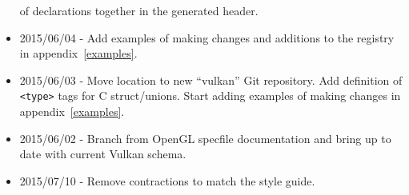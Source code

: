 \documentclass{article}
\def\tag#1{{\tt <#1>\index{<#1>}}}
\begin{document}
\begin{itemize}
      of declarations together in the generated header.
\item 2015/06/04 - Add examples of making changes and additions to the
      registry in appendix~\ref{examples}.
\item 2015/06/03 - Move location to new ``vulkan'' Git repository. Add
      definition of \tag{type} tags for C struct/unions. Start adding
      examples of making changes in appendix~\ref{examples}.
\item 2015/06/02 - Branch from OpenGL specfile documentation and bring up to
      date with current Vulkan schema.
\item 2015/07/10 - Remove contractions to match the style guide.
\end{itemize}

% 

\end{document}
